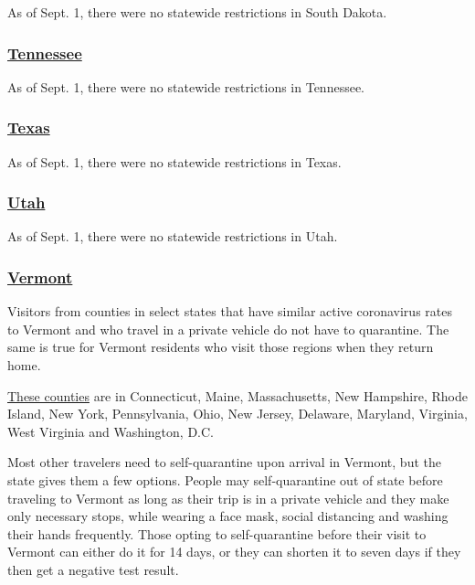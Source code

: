 As of Sept. 1, there were no statewide restrictions in South Dakota.

\hypertarget{tennessee}{%
\subsubsection{\texorpdfstring{\href{https://www.tnvacation.com/articles/tennessee-travel-amid-coronavirus}{Tennessee}}{Tennessee}}\label{tennessee}}

As of Sept. 1, there were no statewide restrictions in Tennessee.

\hypertarget{texas}{%
\subsubsection{\texorpdfstring{\href{https://gov.texas.gov/travel-texas/page/covid19}{Texas}}{Texas}}\label{texas}}

As of Sept. 1, there were no statewide restrictions in Texas.

\hypertarget{utah}{%
\subsubsection{\texorpdfstring{\href{https://www.visitutah.com/plan-your-trip/covid-19/}{Utah}}{Utah}}\label{utah}}

As of Sept. 1, there were no statewide restrictions in Utah.

\hypertarget{vermont}{%
\subsubsection{\texorpdfstring{\href{https://www.healthvermont.gov/response/coronavirus-covid-19/traveling-vermont}{Vermont}}{Vermont}}\label{vermont}}

Visitors from counties in select states that have similar active
coronavirus rates to Vermont and who travel in a private vehicle do not
have to quarantine. The same is true for Vermont residents who visit
those regions when they return home.

\href{https://accd.vermont.gov/covid-19/restart/cross-state-travel}{These
counties} are in Connecticut, Maine, Massachusetts, New Hampshire, Rhode
Island, New York, Pennsylvania, Ohio, New Jersey, Delaware, Maryland,
Virginia, West Virginia and Washington, D.C.

Most other travelers need to self-quarantine upon arrival in Vermont,
but the state gives them a few options. People may self-quarantine out
of state before traveling to Vermont as long as their trip is in a
private vehicle and they make only necessary stops, while wearing a face
mask, social distancing and washing their hands frequently. Those opting
to self-quarantine before their visit to Vermont can either do it for 14
days, or they can shorten it to seven days if they then get a negative
test result.

